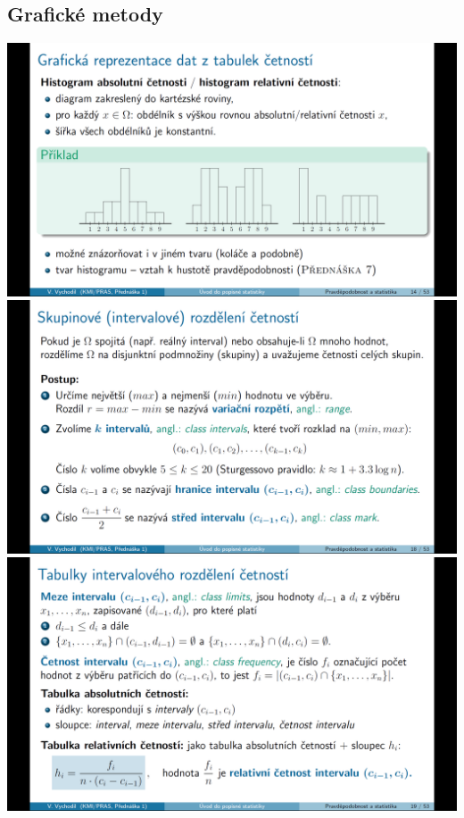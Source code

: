 \subsection{Grafické metody}
\begin{center}
	\includegraphics[scale=0.32]{img/graficke_metody_histogram}
	\includegraphics[scale=0.32]{img/graficke_metody_intervalove_rozdeleni}
	\includegraphics[scale=0.32]{img/graficke_metody_intervalove_rozdeleni_tabulky}

\end{center}
